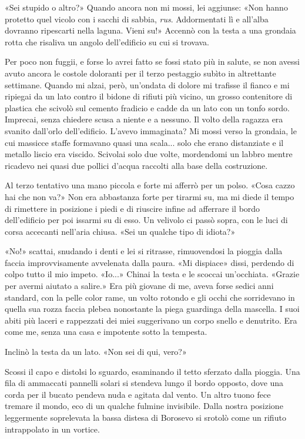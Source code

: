 «Sei stupido o altro?» Quando ancora non mi mossi, lei aggiunse: «Non
hanno protetto quel vicolo con i sacchi di sabbia, \emph{rus}.
Addormentati lì e all'alba dovranno ripescarti nella laguna. Vieni su!»
Accennò con la testa a una grondaia rotta che risaliva un angolo
dell'edificio su cui si trovava.

Per poco non fuggii, e forse lo avrei fatto se fossi stato più in
salute, se non avessi avuto ancora le costole doloranti per il terzo
pestaggio subìto in altrettante settimane. Quando mi alzai, però,
un'ondata di dolore mi trafisse il fianco e mi ripiegai da un lato
contro il bidone di rifiuti più vicino, un grosso contenitore di
plastica che scivolò sul cemento fradicio e cadde da un lato con un
tonfo sordo. Imprecai, senza chiedere scusa a niente e a nessuno. Il
volto della ragazza era svanito dall'orlo dell'edificio. L'avevo
immaginata? Mi mossi verso la grondaia, le cui massicce staffe formavano
quasi una scala... solo che erano distanziate e il metallo liscio era
viscido. Scivolai solo due volte, mordendomi un labbro mentre ricadevo
nei quasi due pollici d'acqua raccolti alla base della costruzione.

Al terzo tentativo una mano piccola e forte mi afferrò per un polso.
«Cosa cazzo hai che non va?» Non era abbastanza forte per tirarmi su, ma
mi diede il tempo di rimettere in posizione i piedi e di riuscire infine
ad afferrare il bordo dell'edificio per poi issarmi su di esso. Un
velivolo ci passò sopra, con le luci di corsa accecanti nell'aria
chiusa. «Sei un qualche tipo di idiota?»

«No!» scattai, snudando i denti e lei si ritrasse, rimuovendosi la
pioggia dalla faccia improvvisamente avvelenata dalla paura. «Mi
dispiace» dissi, perdendo di colpo tutto il mio impeto. «Io...» Chinai
la testa e le scoccai un'occhiata. «Grazie per avermi aiutato a salire.»
Era più giovane di me, aveva forse sedici anni standard, con la pelle
color rame, un volto rotondo e gli occhi che sorridevano in quella sua
rozza faccia plebea nonostante la piega guardinga della mascella. I suoi
abiti più laceri e rappezzati dei miei suggerivano un corpo snello e
denutrito. Era come me, senza una casa e impotente sotto la tempesta.

Inclinò la testa da un lato. «Non sei di qui, vero?»

Scossi il capo e distolsi lo sguardo, esaminando il tetto sferzato dalla
pioggia. Una fila di ammaccati pannelli solari si stendeva lungo il
bordo opposto, dove una corda per il bucato pendeva nuda e agitata dal
vento. Un altro tuono fece tremare il mondo, eco di un qualche fulmine
invisibile. Dalla nostra posizione leggermente soprelevata la bassa
distesa di Borosevo si srotolò come un rifiuto intrappolato in un
vortice.

